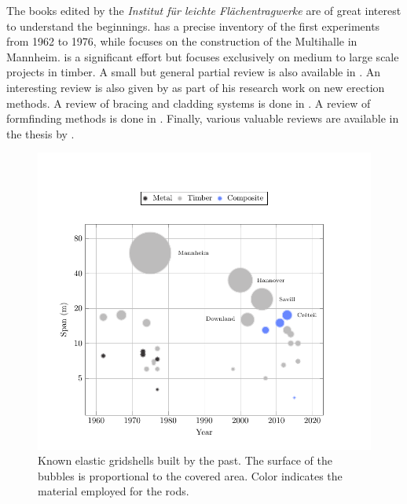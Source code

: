 The books edited by the \emph{Institut für leichte Flächentragwerke} are of great interest to understand the beginnings.  \cite{IL10} has a precise inventory of the first experiments from 1962 to 1976, while  \cite{IL13} focuses on the construction of the Multihalle in Mannheim.  \cite{Chilton2017} is a significant effort but focuses exclusively on medium to large scale projects in timber. A small but general partial review is also available in \cite{Collins2016}. An interesting review is also given by \citet{Quinn2014} as part of his research work on new erection methods. A review of bracing and cladding systems is done in \cite{Cuvilliers2017}. A review of formfinding methods is done in \cite{Vaulot2016}. Finally, various valuable reviews are available in the thesis by \citet{Douthe2007, Bouhaya2010, Tayeb2015a, Lafuente2015}.
\begin{figure}[p]
\begin{fullpage}
	\centering
	\includegraphics[]{ch1_gridshell/plot/1_projects/build.pdf}
	\caption[Known elastic gridshells built by the past.]{Known elastic gridshells built by the past. The surface of the bubbles is proportional to the covered area. Color indicates the material employed for the rods.}
	\label{fig:projectsbymaterial}
\end{fullpage}
\end{figure}

